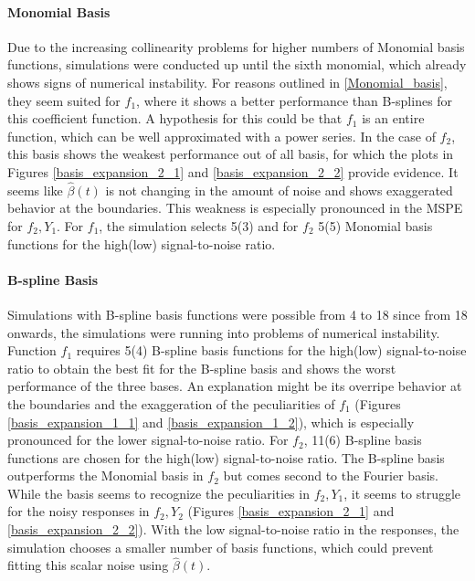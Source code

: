 \documentclass[11pt,twoside,a4paper]{article}
\begin{document}
	\paragraph{Monomial Basis}
	Due to the increasing collinearity problems for higher numbers of Monomial basis functions, simulations were conducted up until the sixth monomial, which already shows signs of numerical instability. For reasons outlined in \ref{Monomial_basis}, they seem suited for $f_1$, where it shows a better performance than B-splines for this coefficient function. A hypothesis for this could be that $f_1$ is an entire function, which can be well approximated with a power series. In the case of $f_2$, this basis shows the weakest performance out of all basis, for which the plots in Figures \ref{basis_expansion_2_1} and \ref{basis_expansion_2_2} provide evidence. It seems like $\hat{\beta}(t)$ is not changing in the amount of noise and shows exaggerated behavior at the boundaries. This weakness is especially pronounced in the MSPE for $f_2,Y_1$. For $f_1$, the simulation selects 5(3) and for $f_2$ 5(5) Monomial basis functions for the high(low) signal-to-noise ratio. 
	\vspace{-0.2cm}
	
	\paragraph{B-spline Basis}
	Simulations with B-spline basis functions were possible from 4 to 18 since from 18 onwards, the simulations were running into problems of numerical instability.
	Function $f_1$ requires 5(4) B-spline basis functions for the high(low) signal-to-noise ratio to obtain the best fit for the B-spline basis and shows the worst performance of the three bases. An explanation might be its overripe behavior at the boundaries and the exaggeration of the peculiarities of $f_1$ (Figures \ref{basis_expansion_1_1} and \ref{basis_expansion_1_2}), which is especially pronounced for the lower signal-to-noise ratio. For $f_2$, 11(6) B-spline basis functions are chosen for the high(low) signal-to-noise ratio. The B-spline basis outperforms the Monomial basis in $f_2$ but comes second to the Fourier basis. While the basis seems to recognize the peculiarities in $f_2,Y_1$, it seems to struggle for the noisy responses in $f_2,Y_2$ (Figures \ref{basis_expansion_2_1} and \ref{basis_expansion_2_2}). With the low signal-to-noise ratio in the responses, the simulation chooses a smaller number of basis functions, which could prevent fitting this scalar noise using $\hat{\beta}(t)$.
	\vspace{-0.2cm}
	
\end{document}
